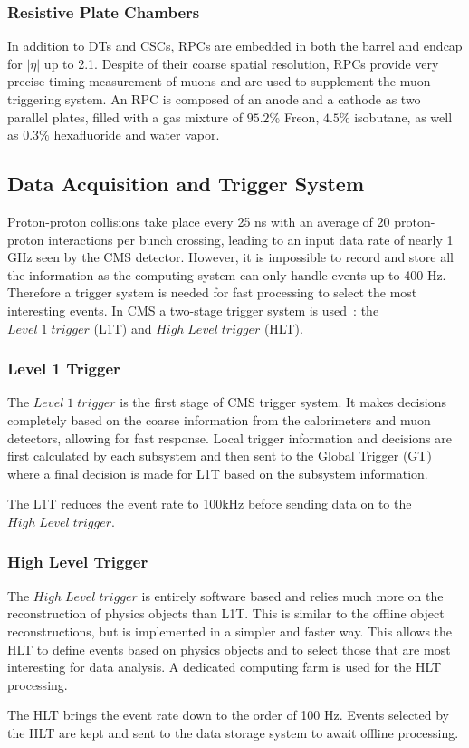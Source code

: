 \subsubsection{Resistive Plate Chambers}
In addition to DTs and CSCs, RPCs are embedded in both the barrel and endcap for $|\eta|$ up to 2.1. Despite of their coarse spatial resolution, RPCs provide very precise timing measurement of muons and are used to supplement the muon triggering system. An RPC is composed of an anode and a cathode as two parallel plates, filled with a gas mixture of $95.2\%$ Freon, $4.5\%$ isobutane, as well as $0.3\%$ hexafluoride and water vapor.

\subsection{Data Acquisition and Trigger System} 
Proton-proton collisions take place every 25 ns with an average of 20 proton-proton interactions per bunch crossing, leading to an input data rate of nearly 1 GHz seen by the CMS detector. However, it is impossible to record and store all the information as the computing system can only handle events up to 400 Hz. Therefore a trigger system is needed for fast processing to select the most interesting events. In CMS a two-stage trigger system is used~\cite{lhc_cmstrigger}: the $Level\; 1\; trigger$ (L1T) and $High\; Level\; trigger$ (HLT).

\subsubsection{Level 1 Trigger}
The $Level\; 1\; trigger$ is the first stage of CMS trigger system. It makes decisions completely based on the coarse information from the calorimeters and muon detectors, allowing for fast response. Local trigger information and decisions are first calculated by each subsystem and then sent to the Global Trigger (GT) where a final decision is made for L1T based on the subsystem information.

\vspace{0.3cm}
The L1T reduces the event rate to 100kHz before sending data on to the $High\; Level\; trigger$.

\subsubsection{High Level Trigger}
The $High\; Level\; trigger$ is entirely software based and relies much more on the reconstruction of physics objects than L1T. This is similar to the offline object reconstructions, but is implemented in a simpler and faster way. This allows the HLT to define events based on physics objects and to select those that are most interesting for data analysis. A dedicated computing farm is used for the HLT processing.

\vspace{0.3cm}
The HLT brings the event rate down to the order of 100 Hz. Events selected by the HLT are kept and sent to the data storage system to await offline processing.

